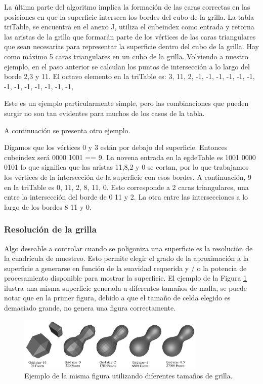 \documentclass[12pt]{article}
\begin{document}
La última parte del algoritmo implica la formación de las caras correctas en las posiciones en que la superficie interseca los bordes del cubo de la grilla. La tabla triTable, se encuentra en el anexo J, utiliza el cubeindex como entrada y retorna las aristas de la grilla que  formarán parte de los vértices de las caras triangulares que sean necesarias para representar la superficie dentro del cubo de la grilla. Hay como máximo 5 caras triangulares en un cubo de la grilla.
Volviendo a nuestro ejemplo, en el paso anterior se calculan los puntos de intersección a lo largo del borde 2,3 y 11. El octavo elemento en la triTable es:
{3, 11, 2, -1, -1, -1, -1, -1, -1, -1, -1, -1, -1, -1, -1, -1},

Este es un ejemplo particularmente simple, pero las combinaciones que pueden surgir no son tan evidentes para muchos de los casos de la tabla.

A continuación se presenta otro ejemplo.

Digamos que los vértices 0 y 3 están por debajo del superficie. Entonces cubeindex será 0000 1001 == 9. La novena entrada en la egdeTable es 1001 0000 0101 lo que significa que las aristas 11,8,2 y 0 se cortan, por lo que trabajamos los vértices de la intersección de la superficie con esos bordes.
A continuación, 9 en la triTable es 0, 11, 2, 8, 11, 0. Esto corresponde a 2 caras triangulares, una entre la intersección del borde de 0 11 y 2. La otra entre las intersecciones a lo largo de los bordes 8 11 y 0.
\subsubsection{Resolución de la grilla}
\noindent Algo deseable a controlar cuando se poligoniza una superficie es la resolución de la cuadrícula de muestreo. Esto permite elegir el grado de la aproximación a la superficie a generarse en función de la suavidad requerida y / o la potencia de procesamiento disponible para mostrar la superficie. El ejemplo de la Figura \ref{mani} ilustra una misma superficie generada a diferentes tamaños de malla, se puede notar que en la primer figura, debido a que el tamaño de celda elegido es demasiado grande, no genera una figura correctamente.
\clearpage
\begin{figure}[h!]
\includegraphics[width=0.8\textwidth,center]{marchingcubes4.png}
\caption{Ejemplo de la misma figura utilizando diferentes tamaños de grilla.}
\label{mani}
\end{figure}
\end{document}
